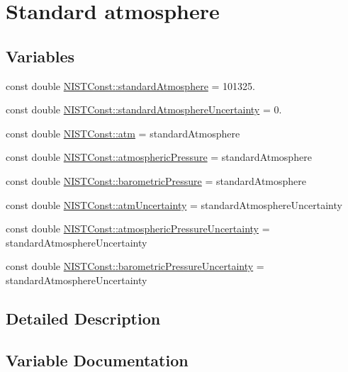 \hypertarget{group___standard_atmosphere}{}\section{Standard atmosphere}
\label{group___standard_atmosphere}
\subsection*{Variables}
\begin{DoxyCompactItemize}
\item 
const double \hyperlink{group___standard_atmosphere_ga260e00232ff2d0d8a24bdbf7f6c87b4e}{N\+I\+S\+T\+Const\+::standard\+Atmosphere} = 101325.
\item 
const double \hyperlink{group___standard_atmosphere_ga784dc63051d7f1dca50f4f2843c8fbcf}{N\+I\+S\+T\+Const\+::standard\+Atmosphere\+Uncertainty} = 0.
\item 
const double \hyperlink{group___standard_atmosphere_ga93a81873c4680c07e0a212604ce6e106}{N\+I\+S\+T\+Const\+::atm} = standard\+Atmosphere
\item 
const double \hyperlink{group___standard_atmosphere_gab92a3a9d0d82fc926390602e825afea5}{N\+I\+S\+T\+Const\+::atmospheric\+Pressure} = standard\+Atmosphere
\item 
const double \hyperlink{group___standard_atmosphere_ga09e2a2bce1e1f38985f98c22d5a8d43d}{N\+I\+S\+T\+Const\+::barometric\+Pressure} = standard\+Atmosphere
\item 
const double \hyperlink{group___standard_atmosphere_gace6ef7e45b2b26b9f48c8495d8a349d0}{N\+I\+S\+T\+Const\+::atm\+Uncertainty} = standard\+Atmosphere\+Uncertainty
\item 
const double \hyperlink{group___standard_atmosphere_gab6ab2c05e40b36d9e6284e8ebaceed37}{N\+I\+S\+T\+Const\+::atmospheric\+Pressure\+Uncertainty} = standard\+Atmosphere\+Uncertainty
\item 
const double \hyperlink{group___standard_atmosphere_gaf437683a9ddd84a22147c418405d41f2}{N\+I\+S\+T\+Const\+::barometric\+Pressure\+Uncertainty} = standard\+Atmosphere\+Uncertainty
\end{DoxyCompactItemize}


\subsection{Detailed Description}


\subsection{Variable Documentation}
\mbox{\label{group___standard_atmosphere_ga93a81873c4680c07e0a212604ce6e106}} 
